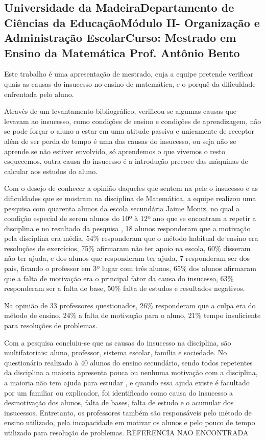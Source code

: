 \documentclass[12pt,a4paper]{article}
\begin{document}
\subsection{Universidade da MadeiraDepartamento de Ciências da EducaçãoMódulo  II- Organização e Administração EscolarCurso: Mestrado em Ensino da Matemática Prof. Antônio Bento}
Este trabalho é uma apresentação de mestrado, cuja a equipe pretende verificar quais as causas do insucesso no ensino de matemática, e o porquê da dificuldade enfrentada pelo aluno. 

Através de um levantamento bibliográfico, verificou-se algumas causas que levavam ao insucesso, como condições de ensino e condições de aprendizagem, não se pode forçar o aluno a estar em uma atitude passiva e unicamente de receptor além de ser perda de tempo é uma das causas do insucesso, ou seja não se aprende se não estiver envolvido, só aprendemos o que vivemos o resto esquecemos, outra causa do insucesso é a introdução precoce das máquinas de calcular aos estudos do aluno.

Com o desejo de conhecer a opinião daqueles que sentem na pele o insucesso e as dificuldades que se mostram na disciplina de Matemática, a equipe realizou uma pesquisa com quarenta alunos da escola secundária Jaime Moniz, no qual a condição especial de serem alunos do 10º à 12º ano que se encontram a repetir a disciplina e no resultado da pesquisa , 18 alunos responderam que a motivação pela disciplina era média, 54\% responderam que o método habitual de ensino era resoluções de exercícios, 75\% afirmaram não ter apoio na escola, 60\% disseram não ter ajuda, e dos alunos que responderam ter ajuda, 7 responderam ser dos pais, ficando o professor em 3º lugar com três alunos, 65\% dos alunos afirmaram que a falta de motivação era o principal fator da causa do insucesso, 63\%  responderam ser a falta de base, 50\% falta de estudos e resultados negativos. 

Na opinião de 33 professores questionados, 26\% responderam que a culpa era do método de ensino, 24\% a falta de motivação para o aluno, 21\% tempo insuficiente para resoluções de problemas. 

Com a pesquisa concluiu-se que as causas do insucesso na disciplina, são multifatoriais: aluno, professor, sistema escolar, família e sociedade. No questionário realizado à 40 alunos do ensino secundário, sendo todos repetentes da disciplina a maioria apresenta pouca ou nenhuma motivação com a disciplina, a maioria não tem ajuda para estudar , e quando essa ajuda existe é facultado por um familiar ou explicador, foi identificado como causa do insucesso a desmotivação dos alunos, falta de bases, falta de estudo e o acumular dos insucessos. Entretanto, os professores também são responsáveis pelo método de ensino utilizado, pela incapacidade em motivar os alunos e pelo pouco de tempo utilizado para resolução de problemas. REFERENCIA NAO ENCONTRADA
\end{document}
